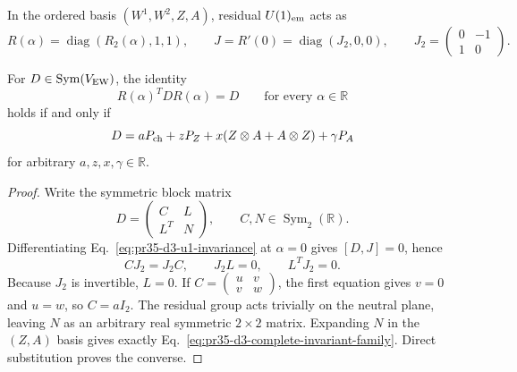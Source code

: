 In the ordered basis $(W^1,W^2,Z,A)$, residual $U(1)_{\rm em}$ acts as
\begin{equation}
 R(\alpha)=\operatorname{diag}(R_2(\alpha),1,1),\qquad
 J=R'(0)=\operatorname{diag}(J_2,0,0),\qquad
 J_2=\begin{pmatrix}0&-1\\1&0\end{pmatrix}.
\end{equation}

\begin{theorem}
\label{thm:pr35-d3-u1-classification}
For $D\in\operatorname{Sym}(V_{\rm EW})$, the identity
\begin{equation}
 R(\alpha)^TDR(\alpha)=D\qquad\text{for every }\alpha\in\mathbb R
 \label{eq:pr35-d3-u1-invariance}
\end{equation}
holds if and only if
\begin{equation}
 D=aP_{\rm ch}+zP_Z+x(Z\otimes A+A\otimes Z)+\gamma P_A
 \label{eq:pr35-d3-complete-invariant-family}
\end{equation}
for arbitrary $a,z,x,\gamma\in\mathbb R$.
\end{theorem}

\begin{proof}
Write the symmetric block matrix
\begin{equation}
 D=\begin{pmatrix}C&L\\L^T&N\end{pmatrix},
 \qquad C,N\in\operatorname{Sym}_2(\mathbb R).
\end{equation}
Differentiating Eq.~\eqref{eq:pr35-d3-u1-invariance} at $\alpha=0$ gives
$[D,J]=0$, hence
\begin{equation}
 CJ_2=J_2C,\qquad J_2L=0,\qquad L^TJ_2=0.
\end{equation}
Because $J_2$ is invertible, $L=0$.  If
$C=\left(\begin{smallmatrix}u&v\\v&w\end{smallmatrix}\right)$, the first equation gives $v=0$ and $u=w$, so $C=aI_2$.  The residual group acts trivially on the neutral plane, leaving $N$ as an arbitrary real symmetric $2\times2$ matrix.  Expanding $N$ in the $(Z,A)$ basis gives exactly
Eq.~\eqref{eq:pr35-d3-complete-invariant-family}.  Direct substitution proves the converse.
\end{proof}

